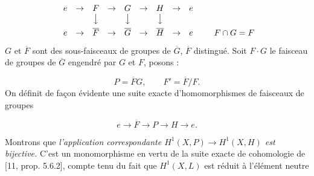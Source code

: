 \[
\begin{array}[b]{ccccccccc}
e&\to&F&\to&G&\to&H&\to&e\\
&&\big\downarrow&&\big\downarrow&&\big\downarrow&&\\[0.45em]
e&\to&\overline F&\to&\overline G&\to
&\overline H&\to&e
\end{array}
\qquad F\cap G=F
\]
$G$ et $\overline F$ sont des sous-faisceaux de groupes de $\overline G$,
$\overline F$ distingué. Soit $F\mathbin{\cdot}G$ le faisceau de
groupes de $\overline G$ engendré par $G$ et $F$, posons :

\[
P=\overline F G,\qquad F'=\overline F/F.
\]
On définit de façon évidente une suite exacte d'homomorphismes de faisceaux de
groupes

\[
e\to\overline F\to P\to H
\to e.
\]

Montrons que \textit{l'application correspondante
$H^1(X,P)\to H^1(X,H)$ est bijective.} C'est un monomorphisme en
vertu de la suite exacte de cohomologie de [11, prop. 5.6.2], compte tenu du
fait que $H^1(X,L)$ est réduit à l'élément neutre

